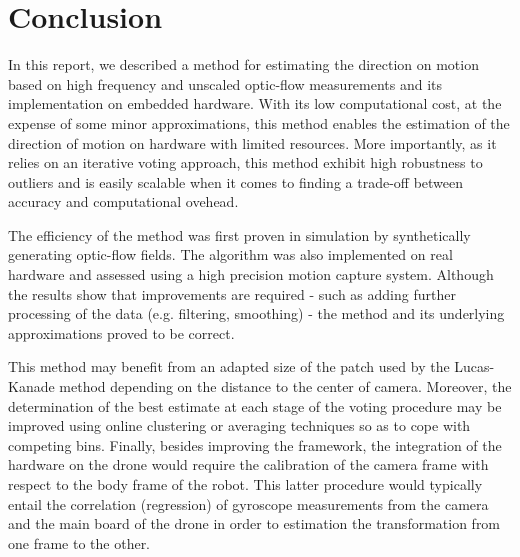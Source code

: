 \section{Conclusion}
In this report, we described a method for estimating the direction on motion based on high frequency and unscaled optic-flow measurements and its implementation on embedded hardware. With its low computational cost, at the expense of some minor approximations, this method enables the estimation of the direction of motion on hardware with limited resources. More importantly, as it relies on an iterative voting approach, this method exhibit high robustness to outliers and is easily scalable when it comes to finding a trade-off between accuracy and computational ovehead.

The efficiency of the method was first proven in simulation by synthetically generating optic-flow fields. The algorithm was also implemented on real hardware and assessed using a high precision motion capture system. Although the results show that improvements are required - such as adding further processing of the data (e.g. filtering, smoothing) - the method and its underlying approximations proved to be correct.

This method may benefit from an adapted size of the patch used by the Lucas-Kanade method depending on the distance to the center of camera. Moreover, the determination of the best estimate at each stage of the voting procedure may be improved using online clustering or averaging techniques so as to cope with competing bins. Finally, besides improving the framework, the integration of the hardware on the drone would require the calibration of the camera frame with respect to the body frame of the robot. This latter procedure would typically entail the correlation (regression) of gyroscope measurements from the camera and the main board of the drone in order to estimation the transformation from one frame to the other. 